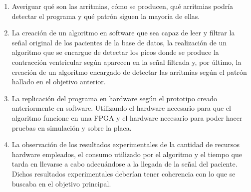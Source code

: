 \begin{enumerate}
    \item Averiguar qué son las arritmias, cómo se producen, qué arritmias podría detectar el programa y qué patrón siguen la mayoría de ellas.
    \item La creación de un algoritmo en software que sea capaz de leer y filtrar la señal original de los pacientes de la base de datos, la realización de un algoritmo que se encargue de detectar los picos donde se produce la contracción ventricular según aparecen en la señal filtrada y, por último, la creación de un algoritmo encargado de detectar las arritmias según el patrón hallado en el objetivo anterior.
    \item La replicación del programa en hardware según el prototipo creado anteriormente en software. Utilizando el hardware necesario para que el algoritmo funcione en una FPGA y el hardware necesario para poder hacer pruebas en simulación y sobre la placa.
    \item La observación de los resultados experimentales de la cantidad de recursos hardware empleados, el consumo utilizado por el algoritmo y el tiempo que tarda en llevarse a cabo adecuándose a la llegada de la señal del paciente. Dichos resultados experimentales deberían tener coherencia con lo que se buscaba en el objetivo principal.
\end{enumerate}



